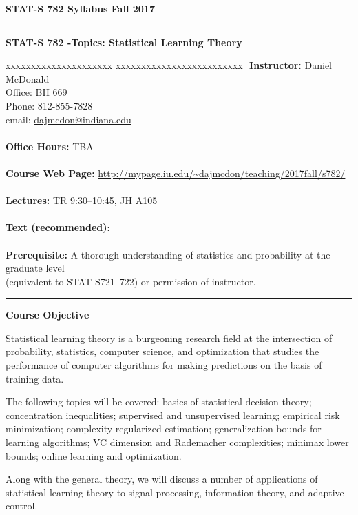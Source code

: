 \documentclass[10pt]{article}
\newcommand{\email}[1]{\href{mailto:#1}{#1}}
\begin{document}
\noindent\textbf{\sc STAT-S 782
        \hfill Syllabus
        \hfill Fall 2017}
\rule{6.5in}{1pt}

\begin{center}
{\bf {\Large STAT-S 782 -Topics: Statistical Learning Theory}}
\end{center}

\begin{tabbing}
xxxxxxxxxxxxxxxxxxxxx \= xxxxxxxxxxxxxxxxxxxxxxxxx \= \kill
{\bf Instructor:}  \> Daniel McDonald\\
\> Office: BH 669\\
\>Phone: 812-855-7828\\
\> email: \email{dajmcdon@indiana.edu}\\
 \\
{\bf Office Hours:}  
\> TBA \\
\\
{\bf Course Web Page:}  \> \url{http://mypage.iu.edu/~dajmcdon/teaching/2017fall/s782/}\\
\\
{\bf Lectures:} \>  TR 9:30--10:45, JH A105\\
\\
{\bf Text (recommended)}:\> \citet{Tsybakov2009,BoucheronLugosi2013}\\
\\
{\bf Prerequisite:} \>  A thorough understanding of statistics and
probability at the graduate level\\
\> (equivalent to STAT-S721--722) or permission of instructor.
                     
\end{tabbing}
\rule{6.5in}{1pt}

{\bf Course Objective}

Statistical learning theory is a burgeoning research field at the
intersection of probability, statistics, computer science, and
optimization that studies the performance of computer algorithms for
making predictions on the basis of training data. 

The following topics will be covered: basics of statistical decision
theory; concentration inequalities; supervised and unsupervised
learning; empirical risk minimization; complexity-regularized
estimation; generalization bounds for learning algorithms; VC
dimension and Rademacher complexities; minimax lower bounds; online
learning and optimization. 

Along with the general theory, we will
discuss a number of applications of statistical learning theory to
signal processing, information theory, and adaptive control.
\end{document}
